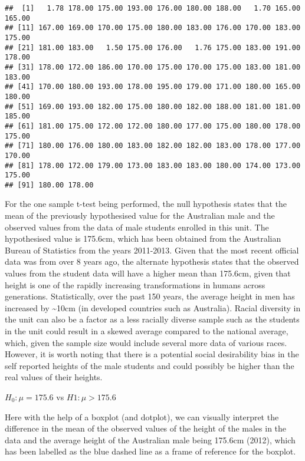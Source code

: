 \documentclass[
]{article}
\begin{document}
\begin{verbatim}
##  [1]   1.78 178.00 175.00 193.00 176.00 180.00 188.00   1.70 165.00 165.00
## [11] 167.00 169.00 170.00 175.00 180.00 183.00 176.00 170.00 183.00 175.00
## [21] 181.00 183.00   1.50 175.00 176.00   1.76 175.00 183.00 191.00 178.00
## [31] 178.00 172.00 186.00 170.00 175.00 170.00 175.00 183.00 181.00 183.00
## [41] 170.00 180.00 193.00 178.00 195.00 179.00 171.00 180.00 165.00 180.00
## [51] 169.00 193.00 182.00 175.00 180.00 182.00 188.00 181.00 181.00 185.00
## [61] 181.00 175.00 172.00 172.00 180.00 177.00 175.00 180.00 178.00 175.00
## [71] 180.00 176.00 180.00 183.00 182.00 182.00 183.00 178.00 177.00 170.00
## [81] 178.00 172.00 179.00 173.00 183.00 183.00 180.00 174.00 173.00 175.00
## [91] 180.00 178.00
\end{verbatim}

For the one sample t-test being performed, the null hypothesis states
that the mean of the previously hypothesised value for the Australian
male and the observed values from the data of male students enrolled in
this unit. The hypothesised value is 175.6cm, which has been obtained
from the Australian Bureau of Statistics from the years 2011-2013. Given
that the most recent official data was from over 8 years ago, the
alternate hypothesis states that the observed values from the student
data will have a higher mean than 175.6cm, given that height is one of
the rapidly increasing transformations in humans across generations.
Statistically, over the past 150 years, the average height in men has
increased by \textasciitilde10cm (in developed countries such as
Australia). Racial diversity in the unit can also be a factor as a less
racially diverse sample such as the students in the unit could result in
a skewed average compared to the national average, which, given the
sample size would include several more data of various races. However,
it is worth noting that there is a potential social desirability bias in
the self reported heights of the male students and could possibly be
higher than the real values of their heights.

\(H_0: \mu = 175.6\) vs \(H1: \mu > 175.6\)

Here with the help of a boxplot (and dotplot), we can visually interpret
the difference in the mean of the observed values of the height of the
males in the data and the average height of the Australian male being
175.6cm (2012), which has been labelled as the blue dashed line as a
frame of reference for the boxplot.
\end{document}
